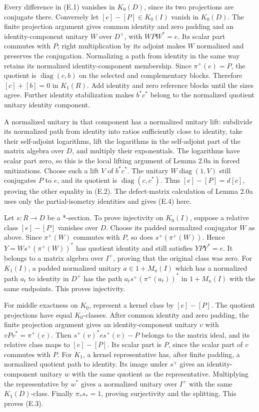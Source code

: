 \documentclass[
  11pt,
]{article}
\begin{document}
Every difference in (E.1) vanishes in \(K_0(D)\), since its two
projections are conjugate there. Conversely let \([e]-[P]\in K_0(I)\)
vanish in \(K_0(D)\). The finite projection argument gives common
identity and zero padding and an identity-component unitary \(W\) over
\(D^+\), with \(WPW^*=e\). Its scalar part commutes with \(P\); right
multiplication by its adjoint makes \(W\) normalized and preserves the
conjugation. Normalizing a path from identity in the same way retains
its normalized identity-component membership. Since \(\pi^+(e)=P\), the
quotient is \(\operatorname{diag}(c,b)\) on the selected and
complementary blocks. Therefore \([c]+[b]=0\) in \(K_1(R)\). Add
identity and zero reference blocks until the sizes agree. Further
identity stabilization makes \(b^*c^*\) belong to the normalized
quotient unitary identity component.

A normalized unitary in that component has a normalized unitary lift:
subdivide its normalized path from identity into ratios sufficiently
close to identity, take their self-adjoint logarithms, lift the
logarithms in the self-adjoint part of the matrix algebra over \(D\),
and multiply their exponentials. The logarithms have scalar part zero,
so this is the local lifting argument of Lemma 2.0a in forced
unitizations. Choose such a lift \(V\) of \(b^*c^*\). The unitary
\(W\operatorname{diag}(1,V)\) still conjugates \(P\) to \(e\), and its
quotient is \(\operatorname{diag}(c,c^*)\). Thus \([e]-[P]=d[c]\),
proving the other equality in (E.2). The defect-matrix calculation of
Lemma 2.0a uses only the partial-isometry identities and gives (E.4)
here.

Let \(s:R\to D\) be a *-section. To prove injectivity on \(K_0(I)\),
suppose a relative class \([e]-[P]\) vanishes over \(D\). Choose its
padded normalized conjugator \(W\) as above. Since \(\pi^+(W)\) commutes
with \(P\), so does \(s^+(\pi^+(W))\). Hence \(Y=W s^+(\pi^+(W))^*\) has
quotient identity and still satisfies \(YPY^*=e\). It belongs to a
matrix algebra over \(I^+\), proving that the original class was zero.
For \(K_1(I)\), a padded normalized unitary \(a\in1+M_n(I)\) which has a
normalized path \(a_t\) to identity in \(D^+\) has the path
\(a_t s^+(\pi^+(a_t))^*\) in \(1+M_n(I)\) with the same endpoints. This
proves injectivity.

For middle exactness on \(K_0\), represent a kernel class by
\([e]-[P]\). The quotient projections have equal \(K_0\)-classes. After
common identity and zero padding, the finite projection argument gives
an identity-component unitary \(v\) with \(vPv^*=\pi^+(e)\). Then
\(s^+(v)^* e s^+(v)-P\) belongs to the matrix ideal, and its relative
class maps to \([e]-[P]\). Its scalar part is \(P\), since the scalar
part of \(v\) commutes with \(P\). For \(K_1\), a kernel representative
has, after finite padding, a normalized quotient path to identity. Its
image under \(s^+\) gives an identity-component unitary \(w\) with the
same quotient as the representative. Multiplying the representative by
\(w^*\) gives a normalized unitary over \(I^+\) with the same
\(K_1(D)\)-class. Finally \(\pi_*s_*=1\), proving surjectivity and the
splitting. This proves (E.3).
\end{document}
